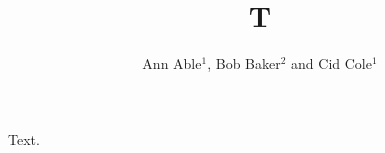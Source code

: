 \documentclass[sigconf]{acmart}
\begin{document}
\title{T}
\author{Ann Able$^1$, Bob Baker$^2$ and Cid Cole$^1$}
\maketitle
Text.
\end{document}
